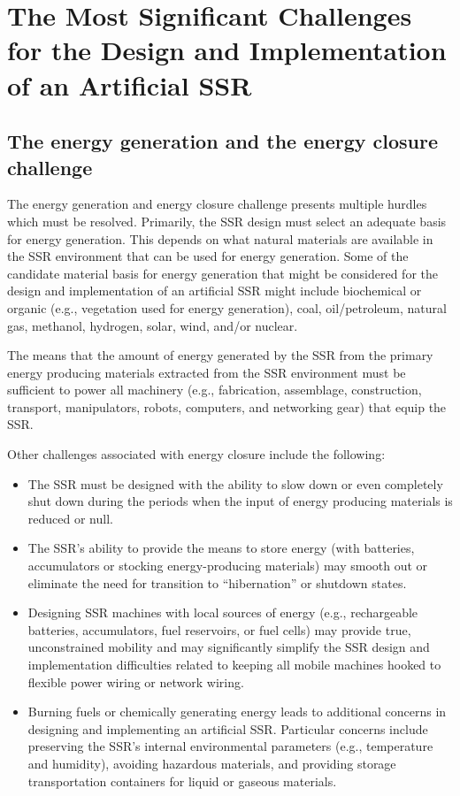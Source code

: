 \section{The Most Significant Challenges for the Design and Implementation of an Artificial SSR}


\subsection[The energy generation and the energy closure challenge]{The
energy generation and the energy closure challenge}

The energy generation and energy closure challenge presents multiple
hurdles which must be resolved.  
Primarily, the SSR design must select an adequate basis for energy generation.
This depends on what natural materials are available in
the SSR environment that can be used for energy generation.  
Some of the candidate material basis for energy
generation that might be considered for the design and implementation
of an artificial SSR might include biochemical or organic (e.g., vegetation used for energy generation), coal, oil/petroleum, natural gas, methanol, hydrogen, solar, wind, and/or nuclear.

The  means that the amount of
energy generated by the SSR from the primary energy producing materials
extracted from the SSR environment must be sufficient to power
all machinery (e.g., fabrication, assemblage, construction, transport,
manipulators, robots, computers, and networking gear) that equip the
SSR.

Other challenges associated with energy closure include the following:

\begin{itemize}
\item The SSR must be designed with the ability to slow down or even
completely shut down during the periods when the input of energy
producing materials is reduced or null.
\item The SSR's ability to provide the means to store energy (with batteries,
accumulators or stocking energy-producing materials) may smooth out or
eliminate the need for transition to “hibernation” or shutdown states.
\item Designing SSR machines with local sources of energy (e.g., 
rechargeable batteries, accumulators, fuel reservoirs, or fuel cells)
may provide true, unconstrained mobility and
may significantly simplify the SSR design and implementation
difficulties related to keeping all mobile machines hooked to flexible
power wiring or network wiring.
\item Burning fuels or chemically generating energy leads to additional concerns in designing and implementing an artificial SSR. Particular concerns include preserving the SSR’s internal environmental parameters (e.g., temperature and humidity), avoiding hazardous materials, and providing storage transportation containers for liquid or gaseous materials.
\end{itemize}

